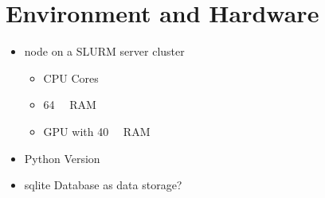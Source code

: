 \section{Environment and Hardware}
\label{sec:experiment_setup:environment_hardware}

\begin{itemize}
  \item node on a SLURM server cluster
        \begin{itemize}
          \item CPU Cores
          \item \SI{64}{\giga\byte} RAM
          \item GPU with \SI{40}{\giga\byte} RAM
        \end{itemize}
  \item Python Version
  \item sqlite Database as data storage?
\end{itemize}